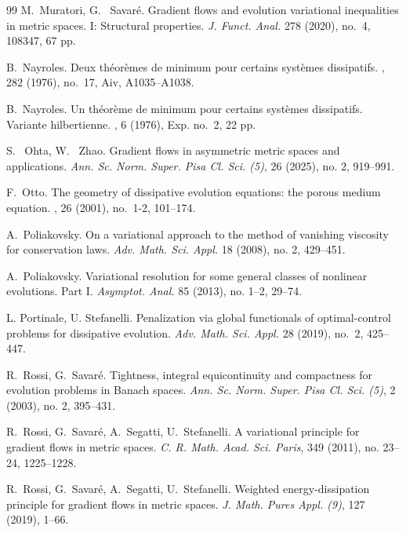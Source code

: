 \documentclass[reqno]{amsart}
\begin{document}
\begin{thebibliography}{99}
M.~Muratori, G.~ Savar\'e. Gradient flows and evolution variational
inequalities in metric spaces. I: Structural properties. {\it
  J. Funct. Anal.} 278 (2020),  no.~4,  108347, 67 pp.

B.~Nayroles.
\newblock Deux th\'eor\`emes de minimum pour certains syst\`emes dissipatifs.
, 282 (1976), 
no.~17, Aiv,  A1035--A1038.

B.~Nayroles.
\newblock Un th\'eor\`eme de minimum pour certains syst\`emes dissipatifs.
  {V}ariante hilbertienne.
, 6 (1976), Exp. 
no.~2, 22 pp. 

S.~  Ohta, W.~ Zhao. Gradient flows in asymmetric metric spaces and
applications. {\it Ann. Sc. Norm. Super. Pisa Cl. Sci. (5)}, 26 (2025), no. 2, 919--991.

F.~Otto. \newblock The geometry of dissipative evolution equations:
the porous medium equation.  ,  26 (2001),  no.~1-2,   101--174.

 A.~Poliakovsky. On a variational approach to the method of
 vanishing viscosity for conservation laws. {\it Adv. Math. Sci. Appl.} 18
 (2008), no. 2, 429--451.

 A.~Poliakovsky. Variational resolution for some general classes of
 nonlinear evolutions. Part I. {\it Asymptot. Anal.} 85 (2013),
 no. 1--2, 29--74.

 L. Portinale, U. Stefanelli.
 Penalization via global functionals of optimal-control problems for dissipative evolution.
 {\it Adv. Math. Sci. Appl.} 28 (2019), no.~2, 425--447.

 R.~Rossi, G.~Savar\'e.
Tightness, integral equicontinuity and compactness for evolution
problems in Banach spaces. 
{\it Ann. Sc. Norm. Super. Pisa Cl. Sci. (5)}, 2 (2003), no. 2, 395--431. 

 R.~Rossi, G.~Savar\'e, A.~Segatti, U.~Stefanelli.  A variational principle for gradient flows
in metric spaces. {\it C. R. Math. Acad. Sci. Paris}, 349 (2011), no. 23--24,
1225--1228.

 R.~Rossi, G.~Savar\'e, A.~Segatti, U.~Stefanelli.  Weighted
 energy-dissipation principle for gradient flows in metric
 spaces. {\it J. Math. Pures Appl. (9)}, 127 (2019), 1--66. 


\end{thebibliography}
\end{document}
